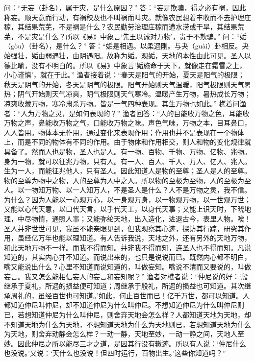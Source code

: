 \documentclass[12pt,UTF8]{ctexbook}
\begin{document}
问：“无妄（卦名），属于灾，是什么原因？”
答：“妄是欺骗，得之必有祸，因此称妄。顺天意而行动，有祸秧及也不叫祸而叫灾。就像农民想着丰收而不去护理庄稼，其结果荒芜，不是祸是什么？农民勤劳治理庄稼而遭水涝或干旱，其结果荒芜，不是灾是什么？所以《易》中象言‘先王以诚对万物’，贵于不欺骗。”
问：“姤（gòu）（卦名），是什么？”
答：“姤是相遇。以柔遇刚。与夬（guài）卦相反。夬始强壮，姤由弱遇壮，由阴遇阳。故称为姤。观姤，天地的本性由此可见。圣人以德比喻，没有不明白的。所以《易》中象言‘姤施命于天下，就像走在霜雪之上，小心谨慎’，就在于此。”
渔者接着说：“春天是阳气的开始，夏天是阳气的极限；秋天是阴气的开始，冬天是阴气的极限。阳气开始则天气温暖，阳气极限则天气暑热；阴气开始则天气凉爽，阴气极限则天气寒冷。温暖产生万物，暑热成长万物；凉爽收藏万物，寒冷肃杀万物。皆是一气四种表现。其生万物也如此。”
樵着问渔者：“人为万物之灵，是如何表现的？”
渔者回答：“人的目能收万物之色，耳能收万物之声，鼻能收万物之气，口能收万物之味。声色气味，万物之本，目耳鼻口，人人皆用。物体本无作用，通过变化来表现作用；作用也并不是表现在一个物体上，而是不同的物体有不同的作用。由于物体和作用相交，则人和物的变化规律就具备了。然而人也是物，圣人也是人。有一物、百物、千物、万物、亿物、兆物。身为一物，就可以征兆万物，只有人。有一人、百人、千人、万人、亿人、兆人。生为一人，而能征兆他人，只有圣人。因此知道人是物的至尊；圣人是人的至尊。物的至尊为物中之物，人的至尊为人中之人。所以物的至极为至物，人的至极为至人。以一物知万物、以一人知万人，不是圣人是什么？人不是万物之灵，我不信。为什么？因为人能以一心观万心，以一身观万身，以一物观万物，以一世观万世；又能以心代天意，以口代天言，以手代天工，以身代天事；又能上识天时，下晓地理，中尽物情，通照人事；又能弥纶天地，出入造化，进退古今，表里人物。唉！圣人并非世世可见，我虽不能亲眼见到，但我观察其心迹，探访其行踪，研究其作用，虽经亿万年也能以理知道。有人告诉我说，天地之外，还有另外的天地万物，和此天地万物不一样。而我不得而知。并非我不得而知，连圣人也不得而知。凡说知道的，其实内心并不知道。而说出来的，也只是说说而已。既然内心都不明白，嘴又能说出什么？心里不知道而说知道的，叫做妄知。嘴说不清而又要说的，叫做妄言。我又怎么能相信妄人的妄言和妄知呢？”
渔者对樵者说：“仲尼说的好：‘殷继承于夏礼，所遇的损益便可知道；周继承于殷礼，所遇的损益也可知道。其次继承周礼的，虽经百世也可知道。’如此，何止百世而已！亿千万世，都可以知道。人都知道仲尼叫仲尼，却不知道仲尼为什么叫仲尼。不想知道仲尼为什么叫仲尼则已，若想知道仲尼为什么叫仲尼，则舍弃天地会怎么样？人都知道天地为天地，却不知道天地为什么为天地，不想知道天地为什么为天地则已，若想知道天地为什么为天地，则舍弃动静会怎么样？一动一静，天地至妙，一动一静之间，天地人至妙。因此仲尼之所以能尽三才之道，是因其行没有辙迹。所以有人说：‘仲尼什么也没说。’又说：‘天什么也没说！但四时运行，百物出生。’这些你知道吗？”
\end{document}
